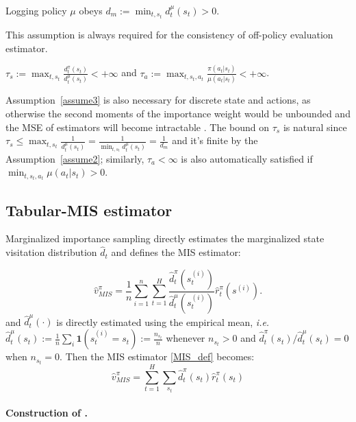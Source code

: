 \begin{assumption}\label{assume2}
	Logging policy $\mu$ obeys $d_m:=\min_{t,s_t}d^\mu_t(s_t)>0$.
\end{assumption}
This assumption is always required for the consistency of off-policy evaluation estimator. 

\begin{assumption}\label{assume3}
	$\tau_s:=\max_{t,s_t}\frac{d^\pi_t(s_t)}{d^\mu_t(s_t)}<+\infty$ and $\tau_a:=\max_{t,s_t,a_t}\frac{\pi(a_t|s_t)}{\mu(a_t|s_t)}<+\infty$.
\end{assumption}
Assumption~\ref{assume3} is also necessary for discrete state and actions, as otherwise the second moments of the importance weight would be unbounded and the MSE of estimators will become intractable . The bound on $\tau_s$ is natural since $\tau_s\leq \max_{t,s_t}\frac{1}{d^\mu_t(s_t)}=\frac{1}{\min_{t,s_t}d^\mu_t(s_t)}=\frac{1}{d_m}$ and it's finite by the Assumption~\ref{assume2}; similarly, $\tau_a<\infty$ is also automatically satisfied if $\min_{t,s_t,a_t}\mu(a_t|s_t)>0$.  

\subsection{Tabular-MIS estimator}

Marginalized importance sampling directly estimates
the marginalized state visitation distribution $\widehat{d}_t$ and defines the MIS estimator:

\begin{equation}\label{MIS_def}
\widehat{v}^\pi_{MIS} =\frac{1}{n}\sum_{i=1}^n\sum_{t=1}^H\frac{\widehat{d}^\pi_t(s_t^{(i)})}{\widehat{d}^\mu_t(s^{(i)}_t)}\widehat{r}^\pi_t(s^{(i)}).
\end{equation}
and $\widehat{d}^\mu_t(\cdot)$ is directly estimated using the empirical mean, \emph{i.e.} $\widehat{d}^\mu_t(s_t):=\frac{1}{n}\sum_i \mathbf{1}(s_t^{(i)}=s_t):=\frac{n_{s_t}}{n}$ whenever $n_{s_t}>0$ and $\widehat{d}^\pi_t(s_t)/\widehat{d}^\mu_t(s_t)=0$ when $n_{s_t}=0$. Then the MIS estimator \eqref{MIS_def} becomes:
\begin{equation}\label{MIS}
\widehat{v}^\pi_{MIS}=\sum_{t=1}^H\sum_{s_t}\widehat{d}^\pi_t(s_t)\widehat{r}^\pi_t(s_t)
\end{equation}

\paragraph{Construction of \TMIS .} 
  
